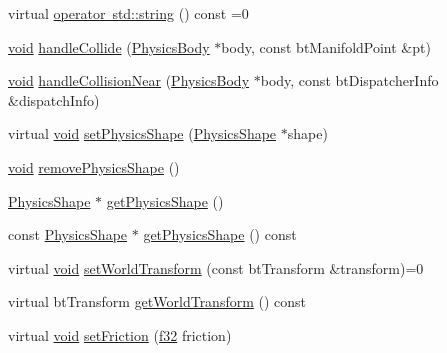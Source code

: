 \begin{DoxyCompactItemize}
\item 
virtual \mbox{\hyperlink{classnjli_1_1_physics_body_a0c12067445dfd7893e37052ae90a9173}{operator std\+::string}} () const =0
\item 
\mbox{\hyperlink{_thread_8h_af1e856da2e658414cb2456cb6f7ebc66}{void}} \mbox{\hyperlink{classnjli_1_1_physics_body_a5e3c626da8fdf32375e0f16f6187934d}{handle\+Collide}} (\mbox{\hyperlink{classnjli_1_1_physics_body}{Physics\+Body}} $\ast$body, const bt\+Manifold\+Point \&pt)
\item 
\mbox{\hyperlink{_thread_8h_af1e856da2e658414cb2456cb6f7ebc66}{void}} \mbox{\hyperlink{classnjli_1_1_physics_body_ae317118b0cad6699ce9d7c1aa27db7fa}{handle\+Collision\+Near}} (\mbox{\hyperlink{classnjli_1_1_physics_body}{Physics\+Body}} $\ast$body, const bt\+Dispatcher\+Info \&dispatch\+Info)
\item 
virtual \mbox{\hyperlink{_thread_8h_af1e856da2e658414cb2456cb6f7ebc66}{void}} \mbox{\hyperlink{classnjli_1_1_physics_body_a5a4d5f7e9f4c39180f157f42be422358}{set\+Physics\+Shape}} (\mbox{\hyperlink{classnjli_1_1_physics_shape}{Physics\+Shape}} $\ast$shape)
\item 
\mbox{\hyperlink{_thread_8h_af1e856da2e658414cb2456cb6f7ebc66}{void}} \mbox{\hyperlink{classnjli_1_1_physics_body_a5ecb49baeaa8c38937ee5fc566702148}{remove\+Physics\+Shape}} ()
\item 
\mbox{\hyperlink{classnjli_1_1_physics_shape}{Physics\+Shape}} $\ast$ \mbox{\hyperlink{classnjli_1_1_physics_body_a3a502c491f089c573083b9958045924a}{get\+Physics\+Shape}} ()
\item 
const \mbox{\hyperlink{classnjli_1_1_physics_shape}{Physics\+Shape}} $\ast$ \mbox{\hyperlink{classnjli_1_1_physics_body_aa03d33a7cb2e4da061f23265c250808c}{get\+Physics\+Shape}} () const
\item 
virtual \mbox{\hyperlink{_thread_8h_af1e856da2e658414cb2456cb6f7ebc66}{void}} \mbox{\hyperlink{classnjli_1_1_physics_body_a570891a03ea4f8243ccec9202b3dc965}{set\+World\+Transform}} (const bt\+Transform \&transform)=0
\item 
virtual bt\+Transform \mbox{\hyperlink{classnjli_1_1_physics_body_ae8501b09e0eda9f0f82069c537f16663}{get\+World\+Transform}} () const
\item 
virtual \mbox{\hyperlink{_thread_8h_af1e856da2e658414cb2456cb6f7ebc66}{void}} \mbox{\hyperlink{classnjli_1_1_physics_body_aa274a01209a062b130d675bec9aef6ed}{set\+Friction}} (\mbox{\hyperlink{_util_8h_a5f6906312a689f27d70e9d086649d3fd}{f32}} friction)
\item 

\end{DoxyCompactItemize}
